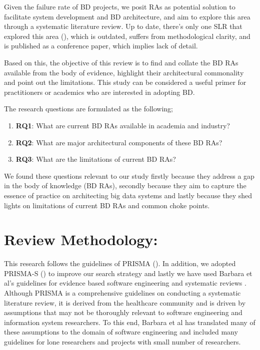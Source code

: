 \documentclass{ieeeaccess}
\begin{document}
Given the failure rate of BD projects, we posit RAs as potential solution to facilitate system development and BD architecture, and aim to explore this area through a systematic literature review. Up to date, there's only one SLR that explored this area (\cite{AtaeiACIS}), which is outdated, suffers from methodological clarity, and is published as a conference paper, which implies lack of detail.

Based on this, the objective of this review is to find and collate the BD RAs available from the body of evidence, highlight their architectural commonality and point out the limitations. This study can be considered a useful primer for practitioners or academics who are interested in adopting BD. 

The research questions are formulated as the following; 
\begin{enumerate}
    \item \textbf{RQ1}: What are current BD RAs available in academia and industry?
    \item \textbf{RQ2}: What are major architectural components of these BD RAs? 
    \item \textbf{RQ3}: What are the limitations of current BD RAs?
\end{enumerate}

We found these questions relevant to our study firstly because they address a gap in the body of knowledge (BD RAs), secondly because they aim to capture the essence of practice on architecting big data systems and lastly because they shed lights on limitations of current BD RAs and common choke points. 

\section{Review Methodology:}
This research follows the guidelines of PRISMA (\cite{page2021prisma}). In addition, we adopted PRISMA-S (\cite{rethlefsen2021prisma}) to improve our search strategy and lastly we have used Barbara et al's guidelines for evidence based software engineering and systematic reviews \cite{kitchenham2015evidence}. Although PRISMA is a comprehensive guidelines on conducting a systematic literature review, it is derived from the healthcare community and is driven by assumptions that may not be thoroughly relevant to software engineering and information system researchers. To this end, Barbara et al \cite{kitchenham2015evidence} has translated many of these assumptions to the domain of software engineering and included many guidelines for lone researchers and projects with small number of researchers.
\end{document}
